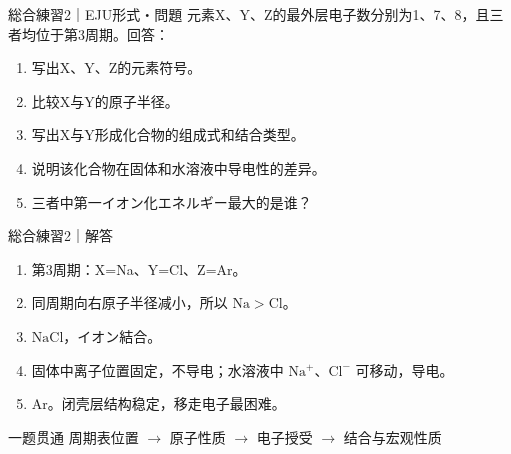 \documentclass[notheorems,aspectratio=169]{beamer}
\begin{document}
\begin{frame}{総合練習2｜EJU形式・問題}
\small
元素X、Y、Z的最外层电子数分别为1、7、8，且三者均位于第3周期。回答：
\begin{enumerate}
  \item 写出X、Y、Z的元素符号。
  \item 比较X与Y的原子半径。
  \item 写出X与Y形成化合物的组成式和结合类型。
  \item 说明该化合物在固体和水溶液中导电性的差异。
  \item 三者中第一イオン化エネルギー最大的是谁？
\end{enumerate}
\end{frame}

\begin{frame}{総合練習2｜解答}
\small
\begin{enumerate}
  \item 第3周期：X=Na、Y=Cl、Z=Ar。
  \item 同周期向右原子半径减小，所以 $\mathrm{Na>Cl}$。
  \item $\mathrm{NaCl}$，イオン結合。
  \item 固体中离子位置固定，不导电；水溶液中 $\mathrm{Na^+}$、$\mathrm{Cl^-}$ 可移动，导电。
  \item Ar。闭壳层结构稳定，移走电子最困难。
\end{enumerate}
\begin{alertblock}{一题贯通}
\centering 周期表位置 $\rightarrow$ 原子性质 $\rightarrow$ 电子授受 $\rightarrow$ 结合与宏观性质
\end{alertblock}
\end{frame}
\end{document}
